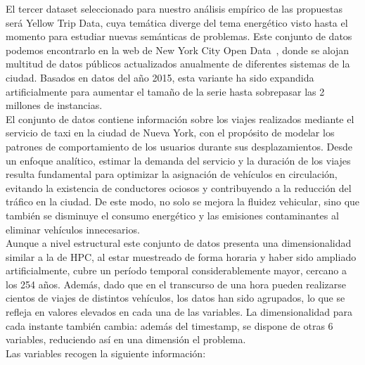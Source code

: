 El tercer dataset seleccionado para nuestro análisis empírico de las propuestas será Yellow Trip Data, cuya temática diverge del tema energético visto hasta el momento para estudiar nuevas semánticas de problemas. Este conjunto de datos podemos encontrarlo en la web de New York City Open Data~\cite{nycopendata}, donde se alojan multitud de datos públicos actualizados anualmente de diferentes sistemas de la ciudad. Basados en datos del año 2015, esta variante ha sido expandida artificialmente para aumentar el tamaño de la serie hasta sobrepasar las 2 millones de instancias.\\

El conjunto de datos contiene información sobre los viajes realizados mediante el servicio de taxi en la ciudad de Nueva York, con el propósito de modelar los patrones de comportamiento de los usuarios durante sus desplazamientos. Desde un enfoque analítico, estimar la demanda del servicio y la duración de los viajes resulta fundamental para optimizar la asignación de vehículos en circulación, evitando la existencia de conductores ociosos y contribuyendo a la reducción del tráfico en la ciudad. De este modo, no solo se mejora la fluidez vehicular, sino que también se disminuye el consumo energético y las emisiones contaminantes al eliminar vehículos innecesarios.\\

Aunque a nivel estructural este conjunto de datos presenta una dimensionalidad similar a la de HPC, al estar muestreado de forma horaria y haber sido ampliado artificialmente, cubre un período temporal considerablemente mayor, cercano a los 254 años. Además, dado que en el transcurso de una hora pueden realizarse cientos de viajes de distintos vehículos, los datos han sido agrupados, lo que se refleja en valores elevados en cada una de las variables. La dimensionalidad para cada instante también cambia: además del timestamp, se dispone de otras 6 variables, reduciendo así en una dimensión el problema.\\

Las variables recogen la siguiente información:


